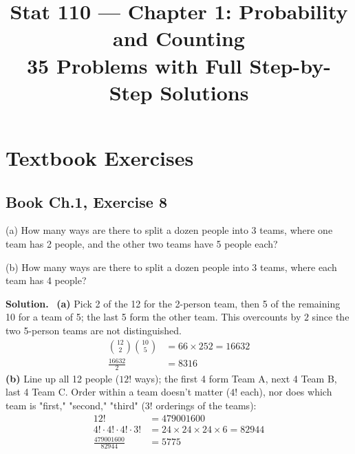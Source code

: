 \documentclass[11pt]{article}
\title{\vspace{-2cm}Stat 110 --- Chapter 1: Probability and Counting\\[2pt]\large 35 Problems with Full Step-by-Step Solutions}
\author{}
\date{}
\newcommand{\Sol}{\vspace{2pt}\noindent\textbf{Solution.}\ }
\begin{document}
\maketitle
\vspace{-1cm}
\tableofcontents
\newpage

\section*{Textbook Exercises}

\subsection{Book Ch.1, Exercise 8}
\begin{qbox}
(a) How many ways are there to split a dozen people into 3 teams, where one team has 2 people, and the other two teams have 5 people each?

(b) How many ways are there to split a dozen people into 3 teams, where each team has 4 people?
\end{qbox}
\Sol
\textbf{(a)} Pick 2 of the 12 for the 2-person team, then 5 of the remaining 10 for a team of 5; the last 5 form the other team. This overcounts by $2$ since the two 5-person teams are not distinguished.
\begin{align*}
\binom{12}{2}\binom{10}{5} &= 66 \times 252 = 16632\\
\frac{16632}{2} &= 8316
\end{align*}
\textbf{(b)} Line up all 12 people ($12!$ ways); the first 4 form Team A, next 4 Team B, last 4 Team C. Order within a team doesn't matter ($4!$ each), nor does which team is "first," "second," "third" ($3!$ orderings of the teams):
\begin{align*}
12! &= 479001600\\
4!\cdot 4!\cdot 4!\cdot 3! &= 24\times 24\times 24\times 6 = 82944\\
\frac{479001600}{82944} &= 5775
\end{align*}

\end{document}
